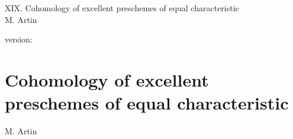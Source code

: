 \documentclass[10pt]{../fichiers-configuration-latex/smfart}
\begin{document}
\begin{center}
XIX. Cohomology of excellent preschemes of equal characteristic\\
M. Artin
\end{center}

version: \showgitstatus
\tableofcontents
\mainmatter

\else
\chapter{Cohomology of excellent preschemes of equal characteristic}
\begin{center}
M. Artin
\end{center}
\fi
{}\label{sga4.exp.XIX}

\renewcommand{\sisi}[2]{#2}






\end{document}
